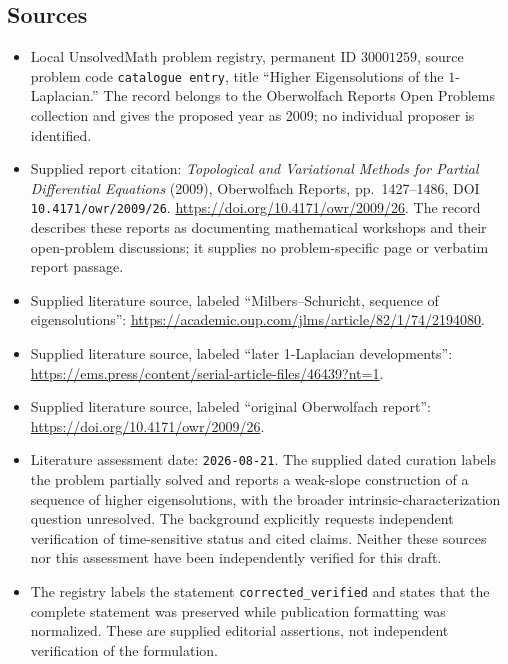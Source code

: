\documentclass[11pt]{article}
\begin{document}
\subsection{Sources}
\begin{itemize}
\item Local UnsolvedMath problem registry, permanent ID \(30001259\), source problem code \texttt{catalogue entry}, title ``Higher Eigensolutions of the \(1\)-Laplacian.'' The record belongs to the Oberwolfach Reports Open Problems collection and gives the proposed year as 2009; no individual proposer is identified.
\item Supplied report citation: \emph{Topological and Variational Methods for Partial Differential Equations} (2009), Oberwolfach Reports, pp.\ 1427--1486, DOI \texttt{10.4171/owr/2009/26}. \url{https://doi.org/10.4171/owr/2009/26}. The record describes these reports as documenting mathematical workshops and their open-problem discussions; it supplies no problem-specific page or verbatim report passage.
\item Supplied literature source, labeled ``Milbers--Schuricht, sequence of eigensolutions'': \url{https://academic.oup.com/jlms/article/82/1/74/2194080}.
\item Supplied literature source, labeled ``later 1-Laplacian developments'': \url{https://ems.press/content/serial-article-files/46439?nt=1}.
\item Supplied literature source, labeled ``original Oberwolfach report'': \url{https://doi.org/10.4171/owr/2009/26}.
\item Literature assessment date: \texttt{2026-08-21}. The supplied dated curation labels the problem partially solved and reports a weak-slope construction of a sequence of higher eigensolutions, with the broader intrinsic-characterization question unresolved. The background explicitly requests independent verification of time-sensitive status and cited claims. Neither these sources nor this assessment have been independently verified for this draft.
\item The registry labels the statement \texttt{corrected\_verified} and states that the complete statement was preserved while publication formatting was normalized. These are supplied editorial assertions, not independent verification of the formulation.
\end{itemize}
\end{document}
